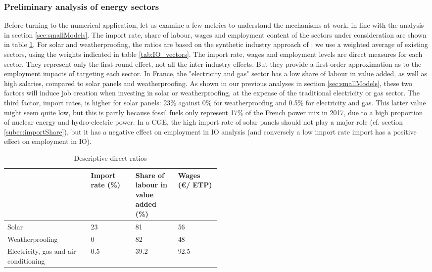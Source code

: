 \subsubsection{Preliminary analysis of energy sectors}
Before turning to the numerical application, let us examine a few metrics to understand the mechanisms at work, in line with the analysis in section \ref{sec:smallModels}. The import rate, share of labour, wages and employment content of the sectors under consideration are shown in table \ref{tab:descriptiveRatios}. 
For solar and weatherproofing, the ratios are based on the synthetic industry approach of \citet{Garrett2017}: we use a weighted average of existing sectors, using the weights indicated in table \ref{tab:IO_vectors}.
The import rate, wages and employment levels are direct measures for each sector. They represent only the first-round effect, not all the inter-industry effects. But they provide a first-order approximation as to the employment impacts of targeting each sector.
In France, the "electricity and gas" sector has a low share of labour in value added, as well as high salaries, compared to solar panels and weatherproofing. As shown in our previous analyses in section \ref{sec:smallModels}, these two factors will induce job creation when investing in solar or weatherproofing, at the expense of the traditional electricity or gas sector.
The third factor, import rates, is higher for solar panels: 23\% against 0\% for weatherproofing and 0.5\% for electricity and gas. This latter value might seem quite low, but this is partly because fossil fuels only represent 17\% of the French power mix in 2017, due to a high proportion of nuclear energy and hydro-electric power. In a CGE, the high import rate of solar panels should not play a major role (cf. section \ref{subec:importShare}), but it has a negative effect on employment in IO analysis (and conversely a low import rate import has a positive effect on employment in IO).

\begin{table}[!h]
	\centering
	\caption{Descriptive direct ratios}
	\label{tab:descriptiveRatios}
	\begin{tabular}{p{0.2\linewidth}p{0.1\linewidth}p{0.1\linewidth}p{0.1\linewidth}}
		\toprule
		& Import rate (\%) & Share of labour in value added (\%) & Wages (\euro / ETP)  \\
		\midrule
		Solar & 23 & 81 & 56 \\
		Weatherproofing & 0 & 82 & 48 \\
		Electricity, gas and air-conditioning & 0.5 & 39.2 & 92.5 \\
		\bottomrule
	\end{tabular}
\end{table}


